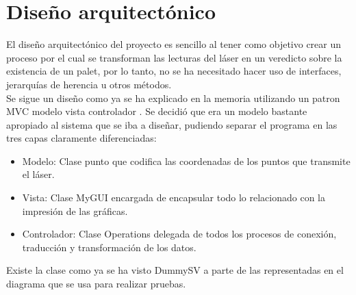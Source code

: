 \section{Diseño arquitectónico}


El diseño arquitectónico del proyecto es sencillo al tener como objetivo crear un proceso por el cual se transforman las lecturas del láser en un veredicto sobre la existencia de un palet, por lo tanto, no se ha necesitado hacer uso de interfaces, jerarquías de herencia u otros métodos.\\
Se sigue un diseño como ya se ha explicado en la memoria utilizando un patron MVC modelo vista controlador \cite{wiki:mvc}.
Se decidió que era un modelo bastante apropiado al sistema que se iba a diseñar, pudiendo separar el programa en las tres capas claramente diferenciadas:\\
\begin{itemize}
\item Modelo: Clase punto que codifica las coordenadas de los puntos que transmite el láser.
\item Vista: Clase MyGUI encargada de encapsular todo lo relacionado con la impresión de las gráficas.
\item Controlador: Clase Operations delegada de todos los procesos de conexión, traducción y transformación de los datos.
\end{itemize}


Existe la clase como ya se ha visto DummySV a parte de las representadas en el diagrama que se usa para realizar pruebas.